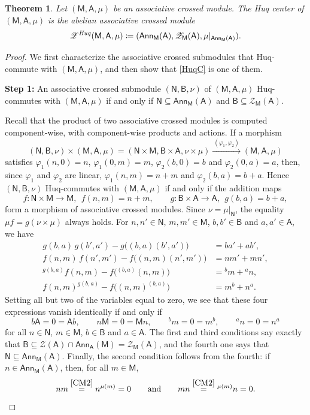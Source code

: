 \documentclass[12pt,reqno]{amsart}
\theoremstyle{plain}
\newtheorem{theorem}{Theorem}[section]
\theoremstyle{definition}
\theoremstyle{remark}
\newcommand{\A}{\ensuremath{\mathsf{A}}}
\newcommand{\B}{\ensuremath{\mathsf{B}}}
\newcommand{\MM}{\ensuremath{\mathsf{M}}}
\newcommand{\NN}{\ensuremath{\mathsf{N}}}
\newcommand{\ZZ}{\ensuremath{\mathscr{Z}}}
\newcommand{\Ann}{\ensuremath{\mathsf{Ann}}}
\numberwithin{equation}{section}
\begin{document}
\begin{theorem}
	Let $(\MM,\A,\mu)$ be an associative crossed module. The Huq center of $(\MM,\A,\mu)$ is the abelian associative crossed module
	\begin{equation} \label{HuqC}
		\ZZ^{\text{\emph{Huq}}}(\MM,\A,\mu) \coloneqq (\Ann_{\MM}(\A),\ZZ_{\MM}(\A),\mu|_{\Ann_{\MM}(\A)}).
	\end{equation}
\end{theorem}
\begin{proof}
	We first characterize the associative crossed submodules that Huq-commute with $(\MM,\A,\mu)$, and then show that \eqref{HuqC} is one of them.
	
\textbf{Step 1:} An associative crossed submodule $(\NN,\B,\nu)$ of $(\MM,\A,\mu)$ Huq-commutes with $(\MM,\A,\mu)$ if and only if $\NN\subseteq\Ann_{\MM}(\A)$ and $\B\subseteq\ZZ_{\MM}(\A)$.
	
	Recall that the product of two associative crossed modules is computed component-wise, with component-wise products and actions. If a morphism
	\[(\NN,\B,\nu)\times (\MM,\A,\mu)= (\NN \times \MM,\B \times \A,\nu \times \mu)\xrightarrow{ \ (\varphi_1,\varphi_2) \ } (\MM,\A,\mu)\]
	satisfies $\varphi_1(n,0)=n$, $\varphi_1(0,m)=m$, $\varphi_2(b,0)=b$ and $\varphi_2(0,a)=a$, then, since $\varphi_1$ and $\varphi_2$ are linear, $\varphi_1(n,m)=n+m$ and $\varphi_2(b,a)=b+a$. Hence $(\NN,\B,\nu)$ Huq-commutes with $(\MM,\A,\mu)$ if and only if the addition maps
	\[
	f\colon \NN\times \MM\rightarrow \MM,\ \ f(n,m)=n+m, \qquad g\colon \B\times \A\rightarrow \A,\ \ g(b,a)=b+a,
	\]
	form a morphism of associative crossed modules. Since $\nu=\mu|_{\NN}$, the equality $\mu f=g(\nu\times\mu)$ always holds. For $n,n'\in\NN$, $m,m'\in\MM$, $b,b'\in\B$ and $a,a'\in\A$, we have
	\begin{align*}
		g(b,a)\,g(b',a')-g\big((b,a)(b',a')\big)&=ba'+ab',\\
		f(n,m)\,f(n',m')-f\big((n,m)(n',m')\big)&=nm'+mn',\\
		{}^{g(b,a)}f(n,m)-f\big({}^{(b,a)}(n,m)\big)&={}^{b}m+{}^{a}n,\\
		f(n,m)^{g(b,a)}-f\big((n,m)^{(b,a)}\big)&=m^{b}+n^{a}.
	\end{align*}
	Setting all but two of the variables equal to zero, we see that these four expressions vanish identically if and only if
	\[
	b\A=0=\A b,\qquad n\MM=0=\MM n,\qquad {}^{b}m=0=m^{b},\qquad {}^{a}n=0=n^{a}
	\]
	for all $n\in\NN$, $m\in\MM$, $b\in\B$ and $a\in\A$. The first and third conditions say exactly that $\B\subseteq\ZZ(\A)\cap\Ann_{\A}(\MM)=\ZZ_{\MM}(\A)$, and the fourth one says that $\NN\subseteq\Ann_{\MM}(\A)$. Finally, the second condition follows from the fourth: if $n\in\Ann_{\MM}(\A)$, then, for all $m\in\MM$,
	\begin{equation}\label{Ann_prod}
		nm\stackrel{\eqref{CM2}}{=}n^{\mu(m)}=0 \qquad\text{and}\qquad mn\stackrel{\eqref{CM2}}{=}{}^{\mu(m)}n=0.
	\end{equation}
	

\end{proof}
\end{document}
